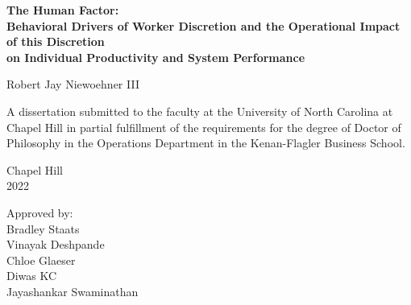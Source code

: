 \begin{titlepage}
\begin{center}


\vspace{2in}
\begin{singlespace}
\bf
The Human Factor:\\
Behavioral Drivers of Worker Discretion and the Operational Impact of this Discretion\\
on Individual Productivity and System Performance
\end{singlespace}


\vspace{61pt} %
\large Robert Jay Niewoehner III
\end{center}



\vspace{50pt}
\begin{singlespace}
\noindent \large
A dissertation submitted to the faculty at the University of North Carolina at Chapel Hill
in partial fulfillment of the requirements for the degree of Doctor of Philosophy in the 
Operations Department in the Kenan-Flagler Business School.
\end{singlespace}


\vspace{50pt}
\begin{center}
\begin{singlespace} \large
Chapel Hill\\
2022
\end{singlespace}
\end{center}


\vfill
\begin{flushright}
\begin{minipage}[t]{1.5in} \large
Approved by:\\
Bradley Staats \\
Vinayak Deshpande \\
Chloe Glaeser \\
Diwas KC \\
Jayashankar Swaminathan
\end{minipage}
\end{flushright}

\end{titlepage}
